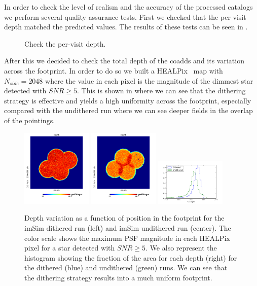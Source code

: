 \documentclass[\docopts]{\docclass}
\begin{document}
In order to check the level of realism and the accuracy of the processed catalogs we perform several quality assurance tests.
First we checked that the per visit depth matched the predicted values. The results of these tests can be seen in
.

\begin{figure}
  \centering
  \caption{Check the per-visit depth.}
  \label{fig:depth_check_a}
\end{figure}

After this we decided to check the total depth of the coadds and its variation across the footprint. In order to do so we built
a HEALPix~\citep{2005ApJ...622..759G} map with $N_{side}=2048$ where the value in each pixel is the magnitude of the dimmest star
detected with $SNR \geq 5$. This is shown in  where we can see that the dithering strategy is effective and
yields a high uniformity across the footprint, especially compared with the undithered run where we can see deeper fields
in the overlap of the pointings.

\begin{figure}
  \centering
  \includegraphics[width=0.3\textwidth]{depth_map_dithered}
  \includegraphics[width=0.3\textwidth]{depth_map_undithered}
  \includegraphics[width=0.3\textwidth]{5_sigma_depth_hist_imsim_dithered}
  \caption{Depth variation as a function of position in the footprint for the imSim dithered run (left) and imSim undithered run
  (center). The color scale shows the maximum PSF magnitude in each HEALPix pixel for a star detected with $SNR \geq 5$.
  We also represent the histogram showing the fraction of the area for each depth (right) for the dithered (blue) and
  undithered (green) runs. We can see that the dithering strategy results into a much uniform footprint.}
  \label{fig:depth_check_b}
\end{figure}
\end{document}
